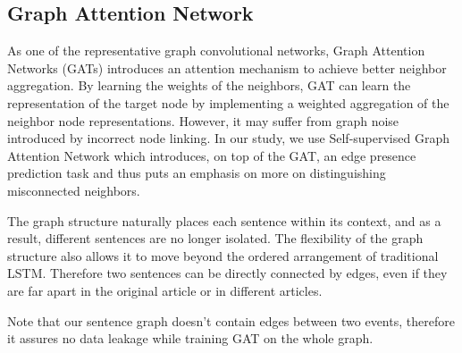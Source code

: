 \subsection{Graph Attention Network}

As one of the representative graph convolutional networks, Graph Attention Networks (GATs) introduces an attention mechanism to achieve better neighbor aggregation. By learning the weights of the neighbors, GAT can learn the representation of the target node by implementing a weighted aggregation of the neighbor node representations. However, it may suffer from graph noise introduced by incorrect node linking. In our study, we use Self-supervised Graph Attention Network \citet{kim2021how} which introduces, on top of the GAT, an edge presence prediction task and thus puts an emphasis on more on distinguishing misconnected neighbors.

The graph structure naturally places each sentence within its context, and as a result, different sentences are no longer isolated. The flexibility of the graph structure also allows it to move beyond the ordered arrangement of traditional LSTM. Therefore two sentences can be directly connected by edges, even if they are far apart in the original article or in different articles. 


Note that our sentence graph doesn't contain edges between two events, therefore it assures no data leakage while training GAT on the whole graph.

